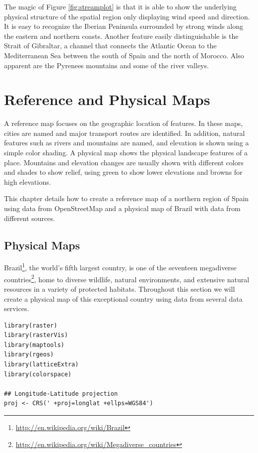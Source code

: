 \documentclass[smallroyalvopaper]{memoir}
\begin{document}
The magic of Figure \ref{fig:streamplot} is that it is able to show the
underlying physical structure of the spatial region only displaying
wind speed and direction. It is easy to recognize the Iberian
Peninsula surrounded by strong winds along the eastern and northern
coasts. Another feature easily distinguishable is the Strait of
Gibraltar, a channel that connects the Atlantic Ocean to the
Mediterranean Sea between the south of Spain and the north of
Morocco. Also apparent are the Pyrenees mountains and some of the
river valleys.

\chapter{Reference and Physical Maps}
\label{sec:org292f78b}
\label{cha:refer-phys-maps}

A reference map focuses on the geographic location of features. In these maps, cities are named and major transport routes are identified. In addition, natural features such as rivers and mountains are named, and elevation is shown using a simple color shading.
A physical map shows the physical landscape features of a place.  Mountains and elevation changes are usually shown with different colors and shades to show relief, using green to show lower elevations and browns for high elevations.

This chapter details how to create a reference map of a northern region of Spain using data from OpenStreetMap and a physical map of Brazil with data from different sources.
\section{Physical Maps}
\label{sec-1}
Brazil\footnote{\url{http://en.wikipedia.org/wiki/Brazil}}, the world's fifth largest country, is one of the
seventeen megadiverse countries\footnote{\url{http://en.wikipedia.org/wiki/Megadiverse_countries}}, home to diverse wildlife,
natural environments, and extensive natural resources in a variety of
protected habitats. Throughout this section we will create a physical
map of this exceptional country using data from several data services.


\lstset{language=R,numbers=none}
\begin{lstlisting}
library(raster)
library(rasterVis)
library(maptools)
library(rgeos)
library(latticeExtra)
library(colorspace)

## Longitude-Latitude projection
proj <- CRS(' +proj=longlat +ellps=WGS84')
\end{lstlisting}
\end{document}
